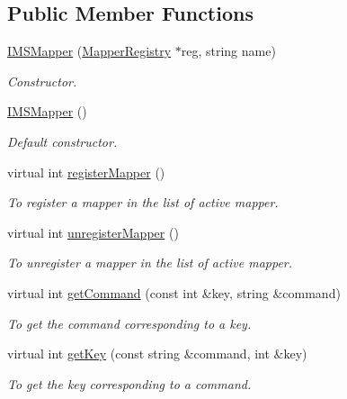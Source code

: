 \subsection*{Public Member Functions}
\begin{DoxyCompactItemize}
\item 
\hyperlink{classIMSMapper_ae98b7c56f1613969e0919f2885ce123d}{IMSMapper} (\hyperlink{classMapperRegistry}{MapperRegistry} $\ast$reg, string name)
\begin{DoxyCompactList}\small\item\em Constructor. \item\end{DoxyCompactList}\item 
\hypertarget{classIMSMapper_aa9a81362b530648633c95d7fb2f6bbca}{
\hyperlink{classIMSMapper_aa9a81362b530648633c95d7fb2f6bbca}{IMSMapper} ()}
\label{classIMSMapper_aa9a81362b530648633c95d7fb2f6bbca}

\begin{DoxyCompactList}\small\item\em Default constructor. \item\end{DoxyCompactList}\item 
virtual int \hyperlink{classIMSMapper_a5454adaabc0a8049263f2f9c50f71d36}{registerMapper} ()
\begin{DoxyCompactList}\small\item\em To register a mapper in the list of active mapper. \item\end{DoxyCompactList}\item 
virtual int \hyperlink{classIMSMapper_a688bf20409385a8c7505164153d243ac}{unregisterMapper} ()
\begin{DoxyCompactList}\small\item\em To unregister a mapper in the list of active mapper. \item\end{DoxyCompactList}\item 
virtual int \hyperlink{classIMSMapper_a25a97459b750bf8204178b9a18637113}{getCommand} (const int \&key, string \&command)
\begin{DoxyCompactList}\small\item\em To get the command corresponding to a key. \item\end{DoxyCompactList}\item 
virtual int \hyperlink{classIMSMapper_a762164cb091f97d2a4698de59cc66cb5}{getKey} (const string \&command, int \&key)
\begin{DoxyCompactList}\small\item\em To get the key corresponding to a command. \item\end{DoxyCompactList}\end{DoxyCompactItemize}



